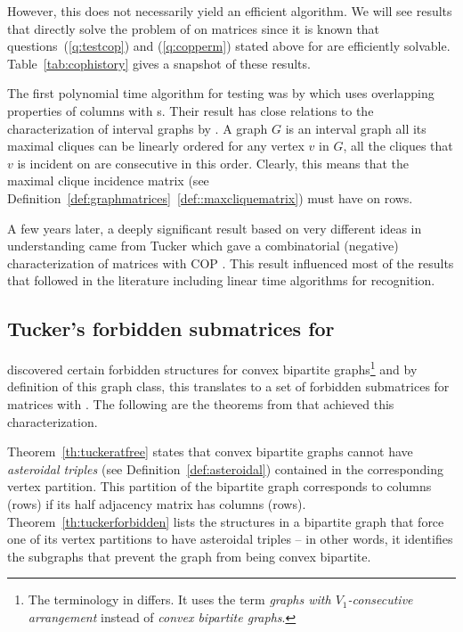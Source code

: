 However, this does not necessarily yield an efficient algorithm. We
will see results that directly solve the problem of \COT on matrices
since it is known that questions~(\ref{q:testcop}) and
(\ref{q:copperm}) stated above for \COP are efficiently solvable.
Table~\ref{tab:cophistory} gives a snapshot of these results.



\tabcophistory

The first polynomial time algorithm for \COP testing was by
\cite{fg65} which uses overlapping properties of columns with \un
s. Their result has close relations to the characterization of
interval graphs by \cite{gh64}. A graph $G$ is an interval graph \iff
all its maximal cliques can be linearly ordered \stt for any vertex
$v$ in $G$, all the cliques that $v$ is incident on are consecutive in
this order. Clearly, this means that the maximal clique incidence
matrix (see
Definition~\ref{def:graphmatrices}~\ref{def::maxcliquematrix}) must
have \COP on rows.

A few years later, a deeply significant result based on very different
ideas in understanding \COP came from Tucker which gave a
combinatorial (negative) characterization of matrices with COP
\cite{at72}. This result influenced most of the \COP results that
followed in the literature including linear time algorithms for \COP
recognition.


\subsection{Tucker's forbidden submatrices for \COP}
\label{sec:tucker}

\cite{at72} discovered certain forbidden structures for convex
bipartite graphs\footnote{The terminology in \cite{at72} differs. It
  uses the term {\em graphs with $V_1$-consecutive arrangement} instead
  of {\em convex bipartite graphs}.} and by definition of this graph
class, this translates to a set of forbidden submatrices for matrices
with \cop.  The following are the theorems from \cite{at72} that
achieved this characterization.


Theorem~\ref{th:tuckeratfree} states that convex bipartite graphs
cannot have {\em asteroidal triples} (see
Definition~\ref{def:asteroidal}) contained in the corresponding vertex
partition. This partition of the bipartite graph corresponds to
columns (rows) if its half adjacency matrix has \COP columns (rows).
Theorem~\ref{th:tuckerforbidden} lists the structures in a bipartite
graph that force one of its vertex partitions to have asteroidal
triples -- in other words, it identifies the subgraphs that prevent
the graph from being convex bipartite.

